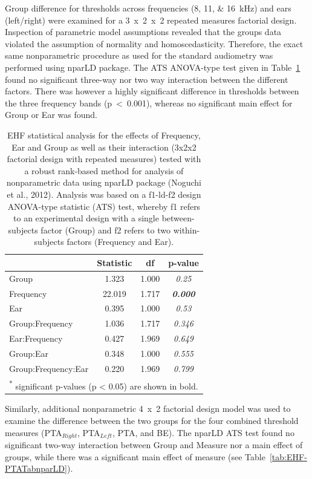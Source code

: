 \documentclass[a4paper, twoside]{templates/ociamthesis}
\begin{document}
Group difference for thresholds across frequencies (8, 11, \& 16~kHz) and ears (left/right) were examined for a 3~x~2~x~2 repeated measures factorial design. Inspection of parametric model assumptions revealed that the groups data violated the assumption of normality and homoscedasticity. Therefore, the exact same nonparametric procedure as used for the standard audiometry was performed using nparLD package. The ATS ANOVA-type test given in Table~\ref{tab:EHF-TabnparLD} found no significant three-way nor two way interaction between the different factors. There was however a highly significant difference in thresholds between the three frequency bands (p~\textless~0.001), whereas no significant main effect for Group or Ear was found.\\

\begin{table}

\caption{\label{tab:EHF-TabnparLD}EHF statistical analysis for the effects of Frequency, Ear and Group as well as their interaction (3x2x2 factorial design with repeated measures) tested with a robust rank-based method for analysis of nonparametric data using nparLD package (Noguchi et al., 2012). Analysis was based on a f1-ld-f2 design ANOVA-type statistic (ATS) test, whereby f1 refers to an experimental design with a single between-subjects factor (Group) and f2 refers to two within-subjects factors (Frequency and Ear).}
\centering
\begin{tabular}[t]{lcc>{}c}
\toprule
  & Statistic & df & p-value\\
\midrule
Group & 1.323 & 1.000 & \em{0.25}\\
Frequency & 22.019 & 1.717 & \em{\textbf{0.000}}\\
Ear & 0.395 & 1.000 & \em{0.53}\\
Group:Frequency & 1.036 & 1.717 & \em{0.346}\\
Ear:Frequency & 0.427 & 1.969 & \em{0.649}\\
Group:Ear & 0.348 & 1.000 & \em{0.555}\\
Group:Frequency:Ear & 0.220 & 1.969 & \em{0.799}\\
\bottomrule
\multicolumn{4}{l}{\textsuperscript{*} significant p-values (p < 0.05) are shown in bold.}\\
\end{tabular}
\end{table}

Similarly, additional nonparametric 4~x~2 factorial design model was used to examine the difference between the two groups for the four combined threshold measures (PTA\(_{Right}\), PTA\(_{Left}\), PTA, and BE). The nparLD ATS test found no significant two-way interaction between Group and Measure nor a main effect of groups, while there was a significant main effect of measure (see Table~\ref{tab:EHF-PTATabnparLD}).
\end{document}
